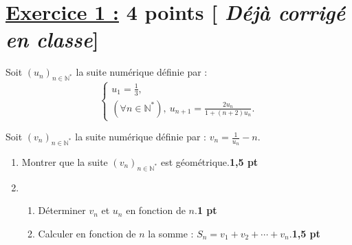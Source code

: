 \documentclass[12pt,a4paper]{article}
\begin{document}
\renewcommand{\arraystretch}{1.5}
\renewcommand{\arrayrulewidth}{1.2pt}
\vspace{3cm}

\section*{\underline{Exercice 1 :} 4 points [\textit{ Déjà corrigé en classe}]}
Soit \((u_n)_{n \in \mathbb{N}^*}\) la suite numérique définie par :
\[
\begin{cases}
u_1 = \frac{1}{3}, \\
(\forall n \in \mathbb{N}^*), \ u_{n+1} = \frac{2u_n}{1 + (n+2)u_n}.
\end{cases}
\]

Soit \((v_n)_{n \in \mathbb{N}^*}\) la suite numérique définie par : \(v_n = \frac{1}{u_n} - n\).

\begin{enumerate}
    \item Montrer que la suite \((v_n)_{n \in \mathbb{N}^*}\) est géométrique.\hfill \textbf{1,5 pt}

    \item 
    \begin{enumerate}
        \item Déterminer \(v_n\) et \(u_n\) en fonction de \(n\).\hfill \textbf{1 pt}
        \item Calculer en fonction de \(n\) la somme : \(S_n = v_1 + v_2 + \cdots + v_n\).\hfill \textbf{1,5 pt}
    \end{enumerate}
\end{enumerate}
\end{document}
